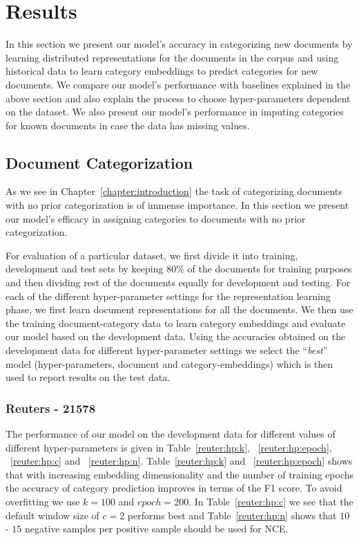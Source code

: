 \section{Results}
\label{sec:results}
In this section we present our model's accuracy in categorizing new documents by learning distributed representations for the documents in the corpus and using historical data to learn category embeddings to predict categories for new documents. We compare our model's performance with baselines explained in the above section and also explain the process to choose hyper-parameters dependent on the dataset. 
We also present our model's performance in imputing categories for known documents in case the data has missing values. 

\subsection{Document Categorization}
\label{sec:results:categorization}
As we see in Chapter~\ref{chapter:introduction} the task of categorizing documents with no prior categorization is of immense importance. In this section we present our model's efficacy in assigning categories to documents with no prior categorization. 

For evaluation of a particular dataset, we first divide it into training, development and test sets by keeping $80\%$ of the documents for training purposes and then dividing rest of the documents equally for development and testing. For each of the different hyper-parameter settings for the representation learning phase, we first learn document representations for all the documents. We then use the training document-category data to learn category embeddings and evaluate our model based on the development data. Using the accuracies obtained on the development data for different hyper-parameter settings we select the ``\emph{best}'' model (hyper-parameters, document and category-embeddings) which is then used to report results on the test data.

\subsubsection{Reuters - 21578}
The performance of our model on the development data for different values of different hyper-parameters is given in Table~\ref{reuter:hp:k}, ~\ref{reuter:hp:epoch}, ~\ref{reuter:hp:c} and ~\ref{reuter:hp:n}. Table~\ref{reuter:hp:k} and ~\ref{reuter:hp:epoch} shows that with increasing embedding dimensionality and the number of training epochs the accuracy of category prediction improves in terms of the F1 score. To avoid overfitting we use $k = 100$ and $epoch = 200$. In Table~\ref{reuter:hp:c} we see that the default window size of $c=2$ performs best and Table~\ref{reuter:hp:n} shows that $10$ - $15$ negative samples per positive sample should be used for NCE.

